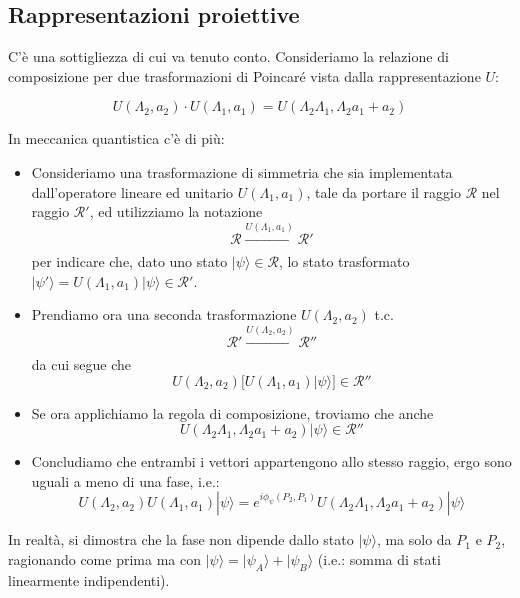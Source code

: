 \documentclass[../main.tex]{subfiles}
\begin{document}
\subsection{Rappresentazioni proiettive}
C'è una sottigliezza di cui va tenuto conto. Consideriamo la relazione di composizione per due trasformazioni di Poincaré vista dalla rappresentazione $U$:

\[
U(\Lambda_2, a_2)\cdot U(\Lambda_1, a_1) = U(\Lambda_2\Lambda_1,\Lambda_2 a_1 +  a_2)
\]

In meccanica quantistica c'è di più:
\begin{itemize}
    \item Consideriamo una trasformazione di simmetria che sia implementata dall'operatore lineare ed unitario \(U(\Lambda_1,a_1)\), tale da portare il raggio \(\mathscr R\) nel raggio \(\mathscr R'\), ed utilizziamo la notazione \[\mathscr R\xrightarrow[]{U(\Lambda_1,a_1)}\mathscr R'\] per indicare che, dato uno stato \(|\psi\rangle\in\mathscr R\), lo stato trasformato \(|\psi'\rangle = U(\Lambda_1,a_1)|\psi\rangle \in\mathscr R'\).
    
    \item Prendiamo ora una seconda trasformazione \(U(\Lambda_2,a_2)\) t.c. \[\mathscr R'\xrightarrow[]{U(\Lambda_2,a_2)}\mathscr R''\]
    da cui segue che \[U(\Lambda_2,a_2)\big[U(\Lambda_1,a_1)|\psi\rangle\big] \in\mathscr R'' \]

    \item Se ora applichiamo la regola di composizione, troviamo che anche
    \[  U(\Lambda_2\Lambda_1,\Lambda_2 a_1 +  a_2)|\psi\rangle \in\mathscr R'' \]

    \item Concludiamo che entrambi i vettori appartengono allo stesso raggio, ergo sono uguali a meno di una fase, i.e.:
    \[
    \boxed{ U(\Lambda_2,a_2)U(\Lambda_1,a_1)|\psi\rangle = e^{i\phi_\psi(P_2,P_1)}U(\Lambda_2\Lambda_1,\Lambda_2 a_1 +  a_2)|\psi\rangle  }
    \]
\end{itemize}

In realtà, si dimostra che la fase non dipende dallo stato $|\psi\rangle$, ma solo da $P_1$ e $P_2$, ragionando come prima ma con \(|\psi\rangle = |\psi_A\rangle + |\psi_B\rangle\) (i.e.: somma di stati linearmente indipendenti).
\end{document}
